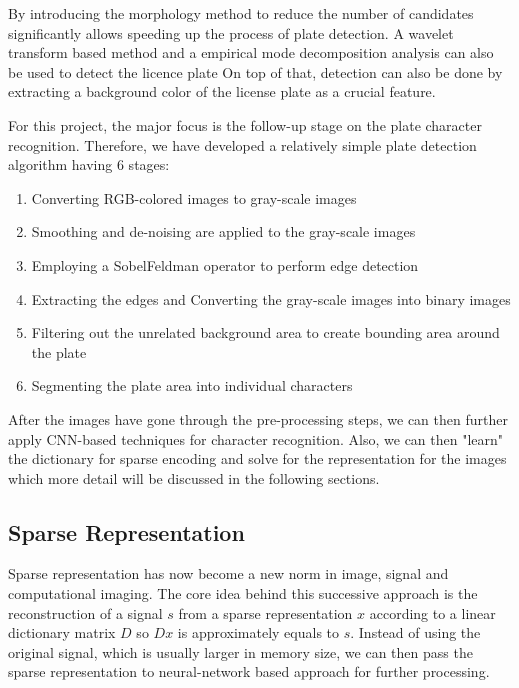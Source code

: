 By introducing the morphology method\cite{lpdectionComplex} to reduce the number 
of candidates significantly allows speeding up the process of plate detection. 
A wavelet transform based method\cite{NovelLPDectionWavelet} and a empirical 
mode decomposition analysis can also be used to detect the licence plate
On top of that, detection can also be done by extracting a background color of
the license plate as a crucial feature\cite{LPDetectMultiStage, DPLHSIcolor}.

For this project, the major focus is the follow-up stage on the plate character
recognition. Therefore, we have developed a relatively simple plate detection
algorithm having 6 stages:
\begin{enumerate}
    \item Converting RGB-colored images to gray-scale images 
    \item Smoothing and de-noising are applied to the gray-scale images
    \item Employing a Sobel\-Feldman operator\cite{SobelOp} to perform edge detection
    \item Extracting the edges and Converting the gray-scale images into binary images
    \item Filtering out the unrelated background area to create bounding area around the plate
    \item Segmenting the plate area into individual characters
\end{enumerate}
After the images have gone through the pre-processing steps, we can then further 
apply CNN-based techniques for character recognition. 
Also, we can then "learn" the dictionary for sparse encoding and solve for the representation
for the images which more detail will be discussed in the following sections.

\subsection{Sparse Representation}
Sparse representation\cite{SpareRepre} has now become a new norm in image, signal
and computational imaging. The core idea behind this successive approach is the 
reconstruction of a signal $s$ from a sparse representation $x$ according to a 
linear dictionary matrix $D$ so $Dx$ is approximately equals to $s$\cite{CDLreview2018}. 
Instead of using the original signal, which is usually larger in memory size, we can then 
pass the sparse representation to neural-network based approach for further processing.

